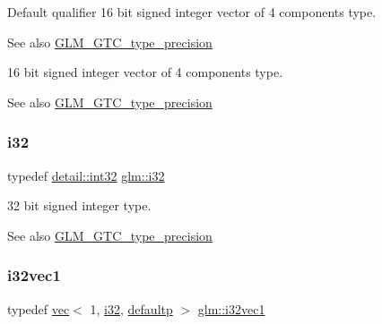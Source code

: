 Default qualifier 16 bit signed integer vector of 4 components type. \begin{DoxySeeAlso}{See also}
\mbox{\hyperlink{group__gtc__type__precision}{G\+L\+M\+\_\+\+G\+T\+C\+\_\+type\+\_\+precision}}
\end{DoxySeeAlso}
16 bit signed integer vector of 4 components type. \begin{DoxySeeAlso}{See also}
\mbox{\hyperlink{group__gtc__type__precision}{G\+L\+M\+\_\+\+G\+T\+C\+\_\+type\+\_\+precision}} 
\end{DoxySeeAlso}
\mbox{\label{group__gtc__type__precision_ga1d8ed5c43e91ea7d4528389da4fa9524}} 
\subsubsection{\texorpdfstring{i32}{i32}}
{\footnotesize\ttfamily typedef \mbox{\hyperlink{namespaceglm_1_1detail_a9f85b4efeca416cdcec2fd08939a2e17}{detail\+::int32}} \mbox{\hyperlink{group__gtc__type__precision_ga1d8ed5c43e91ea7d4528389da4fa9524}{glm\+::i32}}}

32 bit signed integer type. \begin{DoxySeeAlso}{See also}
\mbox{\hyperlink{group__gtc__type__precision}{G\+L\+M\+\_\+\+G\+T\+C\+\_\+type\+\_\+precision}} 
\end{DoxySeeAlso}
\mbox{\label{group__gtc__type__precision_ga97351dd7f0ede9b8b79943f4adcd6a65}} 
\subsubsection{\texorpdfstring{i32vec1}{i32vec1}}
{\footnotesize\ttfamily typedef \mbox{\hyperlink{structglm_1_1vec}{vec}}$<$ 1, \mbox{\hyperlink{group__gtc__type__precision_ga1d8ed5c43e91ea7d4528389da4fa9524}{i32}}, \mbox{\hyperlink{namespaceglm_a36ed105b07c7746804d7fdc7cc90ff25a9d21ccd8b5a009ec7eb7677befc3bf51}{defaultp}} $>$ \mbox{\hyperlink{group__gtc__type__precision_ga97351dd7f0ede9b8b79943f4adcd6a65}{glm\+::i32vec1}}}

